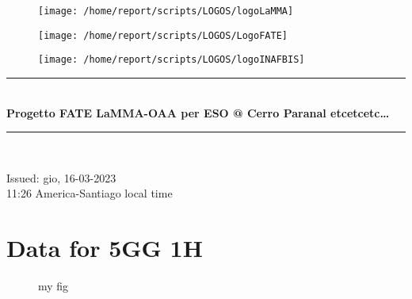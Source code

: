 \documentclass[11pt,english]{article}
\newcommand{\HRule}{\rule{\linewidth}{0.5mm}}
\begin{document}
\begin{figure}
\begin{center}
\hspace{1.5cm}
\parbox{5.5cm}{\texttt{[image: /home/report/scripts/LOGOS/logoLaMMA]}}
\hspace{.3cm}
\parbox{5.5cm}{\texttt{[image: /home/report/scripts/LOGOS/LogoFATE]}}
\hspace{.3cm}
\parbox{5.5cm}{\texttt{[image: /home/report/scripts/LOGOS/logoINAFBIS]}}
\hspace{.1cm}
\vspace{1.2cm}
\end{center}
\end{figure}

\begin{center}
\HRule \\[0.4cm]
\Huge{\textbf{Progetto FATE LaMMA-OAA per ESO @ Cerro Paranal etcetcetc\ldots}}
\HRule \\[0.4cm]
\end{center}

\begin{center}
\vspace{2cm}\Huge{Issued: gio, 16-03-2023\\ 11:26 America-Santiago local time}
\end{center}


\clearpage
\section{Data for 5GG 1H}

\clearpage
\begin{figure}
\begin{minipage}{.5\linewidth}
\centering
{}
\end{minipage}%
\begin{minipage}{.5\linewidth}
\centering
{}
\end{minipage}\par\medskip
\centering
{}
\caption{my fig}
\label{fig:main}
\end{figure}
\end{document}

